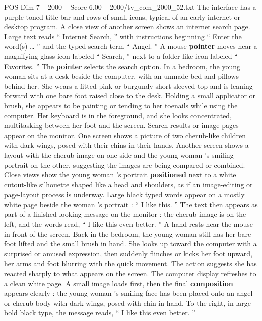 \begin{textsample}{POS Dim 7 – 2000 – Score 6.00 – 2000/tv\_com\_2000\_52.txt}
The interface has a purple-toned title bar and rows of small icons, typical of an early internet or desktop program.
A close view of another screen shows an internet search page.
Large text reads “ Internet Search, ” with instructions beginning “ Enter the word(s) … ” and the typed search term “ Angel. ” A mouse \textbf{pointer} moves near a magnifying-glass icon labeled “ Search, ” next to a folder-like icon labeled “ Favorites. ” The \textbf{pointer} selects the search option.
In a bedroom, the young woman sits at a desk beside the computer, with an unmade bed and pillows behind her.
She wears a fitted pink or burgundy short-sleeved top and is leaning forward with one bare foot raised close to the desk.
Holding a small applicator or brush, she appears to be painting or tending to her toenails while using the computer.
Her keyboard is in the foreground, and she looks concentrated, multitasking between her foot and the screen.
Search results or image pages appear on the monitor.
One screen shows a picture of two cherub-like children with dark wings, posed with their chins in their hands.
Another screen shows a layout with the cherub image on one side and the young woman ’s smiling portrait on the other, suggesting the images are being compared or combined.
Close views show the young woman ’s portrait \textbf{positioned} next to a white cutout-like silhouette shaped like a head and shoulders, as if an image-editing or page-layout process is underway.
Large black typed words appear on a mostly white page beside the woman ’s portrait : “ I like this. ” The text then appears as part of a finished-looking message on the monitor : the cherub image is on the left, and the words read, “ I like this even better. ” A hand rests near the mouse in front of the screen.
Back in the bedroom, the young woman still has her bare foot lifted and the small brush in hand.
She looks up toward the computer with a surprised or amused expression, then suddenly flinches or kicks her foot upward, her arms and foot blurring with the quick movement.
The action suggests she has reacted sharply to what appears on the screen.
The computer display refreshes to a clean white page.
A small image loads first, then the final \textbf{composition} appears clearly : the young woman ’s smiling face has been placed onto an angel or cherub body with dark wings, posed with chin in hand.
To the right, in large bold black type, the message reads, “ I like this even better. ”

\end{textsample}
